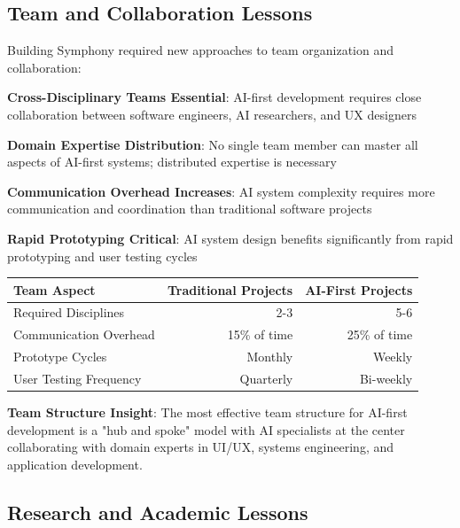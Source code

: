 \subsection*{Team and Collaboration Lessons}

Building Symphony required new approaches to team organization and collaboration:

\begin{expandedlist}
    \item \textbf{Cross-Disciplinary Teams Essential}: AI-first development requires close collaboration between software engineers, AI researchers, and UX designers
    \item \textbf{Domain Expertise Distribution}: No single team member can master all aspects of AI-first systems; distributed expertise is necessary
    \item \textbf{Communication Overhead Increases}: AI system complexity requires more communication and coordination than traditional software projects
    \item \textbf{Rapid Prototyping Critical}: AI system design benefits significantly from rapid prototyping and user testing cycles
\end{expandedlist}

\begin{center}
\begin{tabular}{@{}lrr@{}}
\toprule
\textbf{Team Aspect} & \textbf{Traditional Projects} & \textbf{AI-First Projects} \\
\midrule
Required Disciplines & 2-3 & 5-6 \\
Communication Overhead & 15\% of time & 25\% of time \\
Prototype Cycles & Monthly & Weekly \\
User Testing Frequency & Quarterly & Bi-weekly \\
\bottomrule
\end{tabular}
\end{center}

\textbf{Team Structure Insight}: The most effective team structure for AI-first development is a "hub and spoke" model with AI specialists at the center collaborating with domain experts in UI/UX, systems engineering, and application development.

\subsection*{Research and Academic Lessons}

